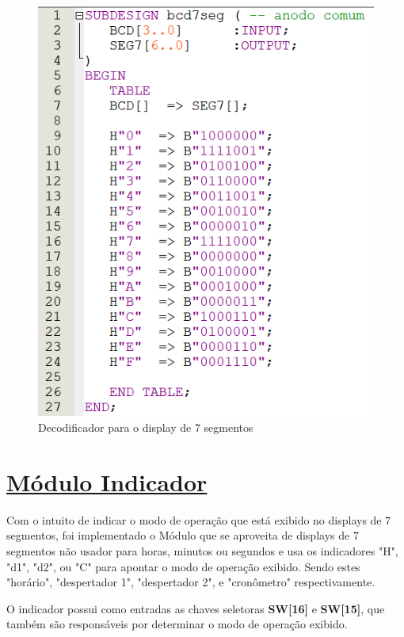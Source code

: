 \documentclass[14pt, oneside]{book}
\newcommand\tab[1][1cm]{\hspace*{#1}}
\theoremstyle{definition}
\begin{document}
                \begin{figure}[H]
                    \centering                    
                    \includegraphics[scale = 1]{bcd_7seg.PNG}
                    \caption{Decodificador para o display de 7 segmentos}
                    \label{decodificador de 7 segmentos}
                \end{figure}
                
            \section[Módulo Indicador]{\hyperlink{toc}{Módulo Indicador}}    
                \tab Com o intuito de indicar o modo de operação que está exibido no displays de $7$ segmentos, foi implementado o Módulo que se aproveita de displays de $7$ segmentos não usador para horas, minutos ou segundos e usa os indicadores "H", "d1", "d2", ou "C" para apontar o modo de operação exibido. Sendo estes "horário", "despertador 1", "despertador 2", e "cronômetro" respectivamente.
                
                \tab O indicador possui como entradas as chaves seletoras \textbf{SW[16]} e \textbf{SW[15]}, que também são responsáveis por determinar o modo de operação exibido. 
                
\end{document}
